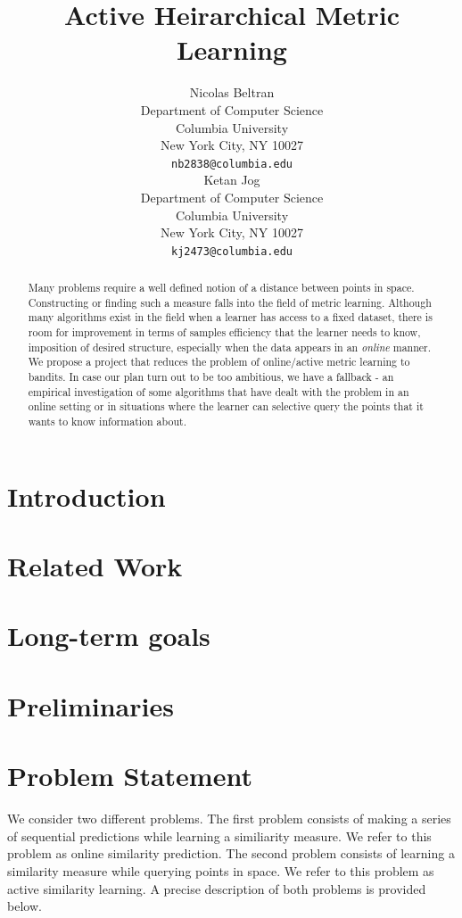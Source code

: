 \documentclass{article}
\title{Active Heirarchical Metric Learning}
\author{
  Nicolas Beltran\\
  Department of Computer Science\\
  Columbia University\\
  New York City, NY 10027 \\
  \texttt{nb2838@columbia.edu}\\
  \And
  Ketan Jog\\
  Department of Computer Science\\
  Columbia University\\
  New York City, NY 10027 \\
  \texttt{kj2473@columbia.edu}\\
}
\begin{document}
\maketitle

\begin{abstract}
    Many problems require a well defined notion of a distance between points in space.
    Constructing or finding such a measure falls into the field of metric learning.
    Although many algorithms exist in the field when a learner has access to a fixed dataset,  there is room for improvement in terms of samples efficiency that the learner needs to know, imposition of desired structure, especially when the data appears in an \textit{online} manner.
    We propose a project that reduces the problem of online/active metric learning to bandits. In case our plan turn out to be too ambitious, we have a fallback - an empirical investigation of some algorithms that have dealt with the problem in an online setting or in situations where the learner can selective query the points that it wants to know information about.
\end{abstract}


\section{Introduction}

\section{Related Work}

\section{Long-term goals}

\section{Preliminaries}


\section{Problem Statement}
\label{problem-statement}
We consider two different problems.
The first problem consists of making a series of sequential predictions while learning a
similiarity measure. We refer to this problem as online similarity prediction.
The second problem consists of learning a similarity measure while querying points in space.
We refer to this problem as active similarity learning.
A precise description of both problems is provided below.
\end{document}
